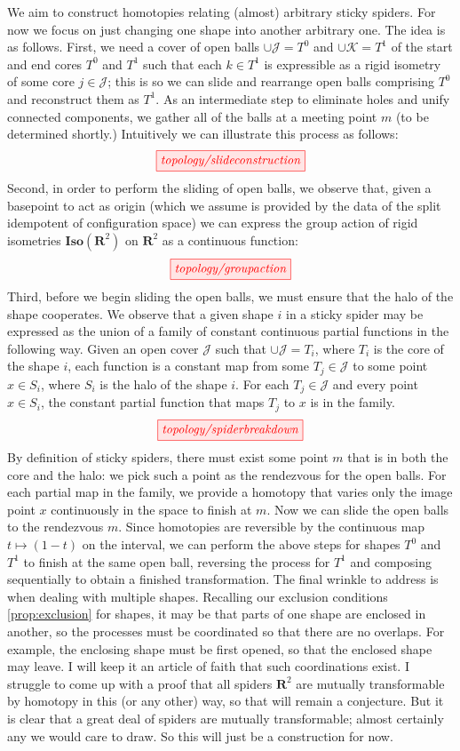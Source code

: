 \begin{construction}\label{cons:morph}
We aim to construct homotopies relating (almost) arbitrary sticky spiders. For now we focus on just changing one shape into another arbitrary one. The idea is as follows. First, we need a cover of open balls $\cup\mathcal{J} = T^0$ and $\cup\mathcal{K} = T^1$ of the start and end cores $T^0$ and $T^1$ such that each $k \in T^1$ is expressible as a rigid isometry of some core $j \in \mathcal{J}$; this is so we can slide and rearrange open balls comprising $T^0$ and reconstruct them as $T^1$. As an intermediate step to eliminate holes and unify connected components, we gather all of the balls at a meeting point $m$ (to be determined shortly.) Intuitively we can illustrate this process as follows:
\[\tikzfig{topology/slideconstruction}\]
Second, in order to perform the sliding of open balls, we observe that, given a basepoint to act as origin (which we assume is provided by the data of the split idempotent of configuration space) we can express the group action of rigid isometries $\mathbf{Iso}(\mathbf{R}^2)$ on $\mathbf{R}^2$ as a continuous function:
\[\tikzfig{topology/groupaction}\]
Third, before we begin sliding the open balls, we must ensure that the halo of the shape cooperates. We observe that a given shape $i$ in a sticky spider may be expressed as the union of a family of constant continuous partial functions in the following way. Given an open cover $\mathcal{J}$ such that $\cup\mathcal{J} = T_i$, where $T_i$ is the core of the shape $i$, each function is a constant map from some $T_j \in \mathcal{J}$ to some point $x \in S_i$, where $S_i$ is the halo of the shape $i$. For each $T_j \in \mathcal{J}$ and every point $x \in S_i$, the constant partial function that maps $T_j$ to $x$ is in the family.
\[\tikzfig{topology/spiderbreakdown}\]
By definition of sticky spiders, there must exist some point $m$ that is in both the core and the halo: we pick such a point as the rendezvous for the open balls. For each partial map in the family, we provide a homotopy that varies only the image point $x$ continuously in the space to finish at $m$. Now we can slide the open balls to the rendezvous $m$. Since homotopies are reversible by the continuous map $t \mapsto (1-t)$ on the interval, we can perform the above steps for shapes $T^0$ and $T^1$ to finish at the same open ball, reversing the process for $T^1$ and composing sequentially to obtain a finished transformation. The final wrinkle to address is when dealing with multiple shapes. Recalling our exclusion conditions \ref{prop:exclusion} for shapes, it may be that parts of one shape are enclosed in another, so the processes must be coordinated so that there are no overlaps. For example, the enclosing shape must be first opened, so that the enclosed shape may leave. I will keep it an article of faith that such coordinations exist. I struggle to come up with a proof that all spiders $\mathbf{R}^2$ are mutually transformable by homotopy in this (or any other) way, so that will remain a conjecture. But it is clear that a great deal of spiders are mutually transformable; almost certainly any we would care to draw. So this will just be a construction for now.
\end{construction}

